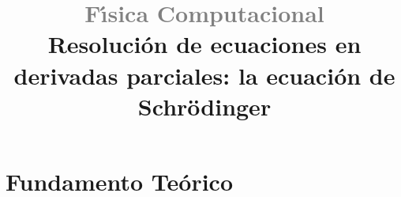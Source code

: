 \documentclass[12pt]{iopart}
\begin{document}
\title{\textcolor{gray}{F{\'\i}sica Computacional} \\ Resoluci{\'o}n de ecuaciones en derivadas parciales: la ecuaci{\'o}n de Schr\"odinger}


%
%

%
%
%
%
%
%


\newpage

%





\section{Fundamento Te\'orico}
\end{document}
